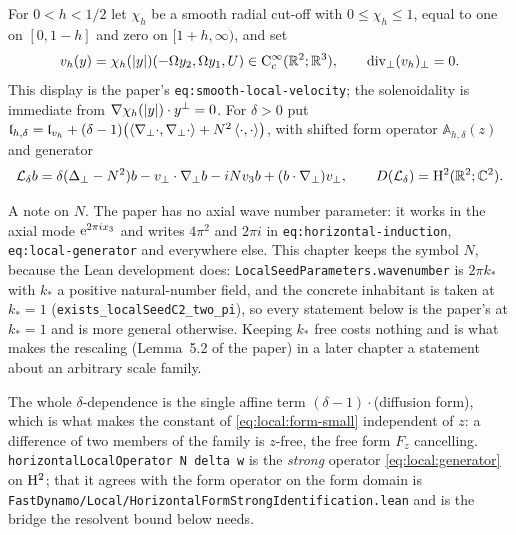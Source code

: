 \begin{definition}
  \label{def:local:smoothed-velocity}
  \leanok
  For $0<h<1/2$ let $\chi_h$ be a smooth radial cut-off with $0\leq\chi_h\leq1$, equal to
  one on $[0,1-h]$ and zero on $[1+h,\infty)$, and set
  \begin{equation}
    v_h(y)=\chi_h(\left\lvert y\right\rvert)(-\Omega y_2,\Omega y_1,U)\in\mathrm{C}_c^\infty(\mathbb{R}^2;\mathbb{R}^3),
    \qquad\operatorname{div}_\perp(v_h)_\perp=0 .
    \label{eq:local:smooth-velocity}
  \end{equation}
  This display is the paper's \texttt{eq:smooth-local-velocity}; the
  solenoidality is immediate from $\nabla\chi_h(\left\lvert y\right\rvert)\cdot y^\perp=0$.
  For $\delta>0$ put
  $\mathfrak l_{h,\delta}=\mathfrak l_{v_h}
   +(\delta-1)\bigl(\left\langle\nabla_\perp\cdot,\nabla_\perp\cdot\right\rangle+N^2\left\langle\cdot,\cdot\right\rangle\bigr)$,
  with shifted form operator $\mathbb A_{h,\delta}(z)$ and generator
  \begin{equation}
    \mathcal{L}_\delta b=\delta(\Delta_\perp-N^2)b-v_\perp\cdot\nabla_\perp b-iNv_3b
      +(b\cdot\nabla_\perp)v_\perp,
    \qquad D(\mathcal{L}_\delta)=\mathrm{H}^2(\mathbb{R}^2;\mathbb{C}^2).
    \label{eq:local:generator}
  \end{equation}
\end{definition}

A note on $N$.  The paper has no axial wave number parameter: it works in the axial mode
$\mathrm{e}^{2\pi ix_3}$ and writes $4\pi^2$ and $2\pi i$ in \texttt{eq:horizontal-induction},
\texttt{eq:local-generator} and everywhere else.  This chapter keeps the symbol $N$, because
the Lean
development does: \texttt{LocalSeedParameters.wavenumber} is $2\pi k_*$ with $k_*$ a
positive natural-number field, and the concrete inhabitant is taken at $k_*=1$
(\texttt{exists\_localSeedC2\_two\_pi}), so every statement below is the paper's at
$k_*=1$ and is more general otherwise.  Keeping $k_*$ free costs nothing and is what makes
the rescaling (Lemma~5.2 of the paper) in a later chapter a statement about an arbitrary scale family.

The whole $\delta$-dependence is the single affine term $(\delta-1)\cdot$(diffusion form),
which is what makes the constant of \eqref{eq:local:form-small} independent of $z$: a
difference of two members of the family is $z$-free, the free form $F_z$ cancelling.
\texttt{horizontalLocalOperator N delta w} is the \emph{strong} operator
\eqref{eq:local:generator} on $\mathrm{H}^2$; that it agrees with the form operator on the form
domain is \texttt{FastDynamo/Local/HorizontalFormStrongIdentification.lean} and is the
bridge the resolvent bound below needs.


